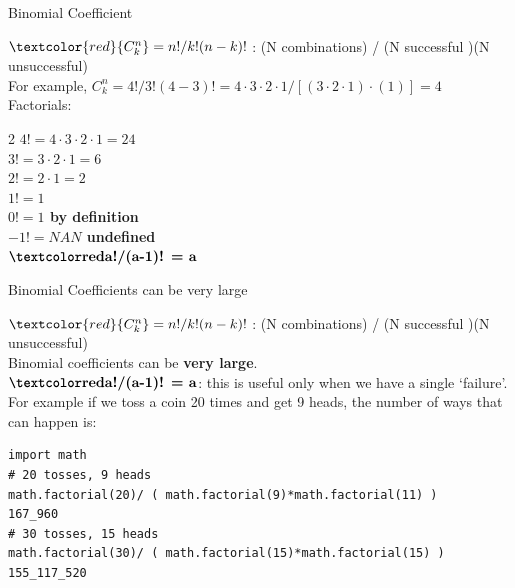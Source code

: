 \documentclass[10pt,sans,english,compress,xcolor=dvipsnames]{beamer}
\begin{document}
\begin{frame}{Binomial Coefficient}

$\textcolor{red}{C_k^n} = n! /k!(n-k)!$ : (N combinations) / (N successful )(N unsuccessful)\\[1ex]


For example, $C_k^n = 4!/3!(4-3)! = 4\cdot 3\cdot 2\cdot 1/ [(3\cdot 2 \cdot 1)\cdot ( 1) ]= 4$\\[1ex]

Factorials:\\
\begin{multicols}{2}
\small
$4! =4\cdot 3\cdot 2\cdot 1=24$\\[1ex]
$3! =3\cdot 2\cdot 1=6$\\[1ex]
$2! =2\cdot 1 =2$\\[1ex]
$1! = 1$\\[1ex]
\textbf{$0! =1$ by definition}\\[1ex]
\textbf{$-1!= NAN$ undefined}\\[1ex]
$\boo{a!/(a-1)! = a}$\\[1ex] %

\end{multicols}

\end{frame} 


\begin{frame} [fragile] {Binomial Coefficients can be very large}
\small

$\textcolor{red}{C_k^n} = n! /k!(n-k)!$ : (N combinations) / (N successful )(N unsuccessful)\\[1ex]

Binomial coefficients can be \textbf{very large}.\\

$\boo{a!/(a-1)! = a}$: this is useful only when we have a single `failure'.\\

For example if we toss a coin 20 times and get 9 heads, the number of ways that can happen is:\\
\begin{verbatim}
import math
# 20 tosses, 9 heads
math.factorial(20)/ ( math.factorial(9)*math.factorial(11) )
167_960
# 30 tosses, 15 heads
math.factorial(30)/ ( math.factorial(15)*math.factorial(15) )
155_117_520
\end{verbatim}






\end{frame} 
\end{document}
